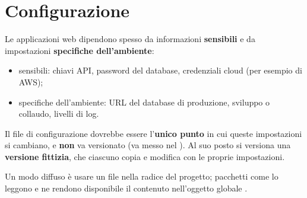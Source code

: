 \section{Configurazione}

Le applicazioni web dipendono spesso da informazioni \textbf{sensibili} e da
impostazioni \textbf{specifiche dell'ambiente}:

\begin{itemize}
  \item sensibili: chiavi API, password del database, credenziali cloud (per
        esempio di AWS);
  \item specifiche dell'ambiente: URL del database di produzione, sviluppo o
        collaudo, livelli di log.
\end{itemize}


Il file di configurazione dovrebbe essere l'\textbf{unico punto} in cui queste
impostazioni si cambiano, e \textbf{non} va versionato (va messo nel
). Al suo posto si versiona una \textbf{versione fittizia}, che
ciascuno copia e modifica con le proprie impostazioni.

Un modo diffuso è usare un file  nella radice del progetto; pacchetti
come  lo leggono e ne rendono disponibile il contenuto
nell'oggetto globale .

